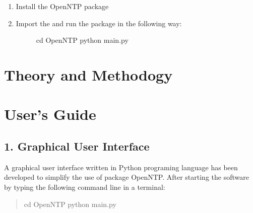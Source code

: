 \documentclass[letterpaper,10pt,english]{sphinxmanual}
\begin{document}
\begin{enumerate}
\begin{description}
\end{description}

\item {} \begin{description}
\item[{Install the OpenNTP package}] \leavevmode
\begin{sphinxVerbatim}[commandchars=\\\{\}]
   
\end{sphinxVerbatim}

\end{description}

\item {} \begin{description}
\item[{Import the  and run the package in the following way:}] \leavevmode
\begin{sphinxVerbatim}[commandchars=\\\{\}]
cd OpenNTP
\PYGZdl{} python main.py
\end{sphinxVerbatim}

\end{description}

\end{enumerate}


\chapter{Theory and Methodogy}
\label{\detokenize{Theory:theory-and-methodogy}}\label{\detokenize{Theory::doc}}

\chapter{User’s Guide}
\label{\detokenize{Guide:user-s-guide}}\label{\detokenize{Guide::doc}}

\section{1. Graphical User Interface}
\label{\detokenize{Guide:graphical-user-interface}}
A graphical user interface written in Python programing language has been developed to simplify the use of package OpenNTP.
After starting the software by typing the following command line in a terminal:
\begin{quote}

\begin{sphinxVerbatim}[commandchars=\\\{\}]
cd OpenNTP
\PYGZdl{} python main.py
\end{sphinxVerbatim}
\end{quote}
\end{document}
